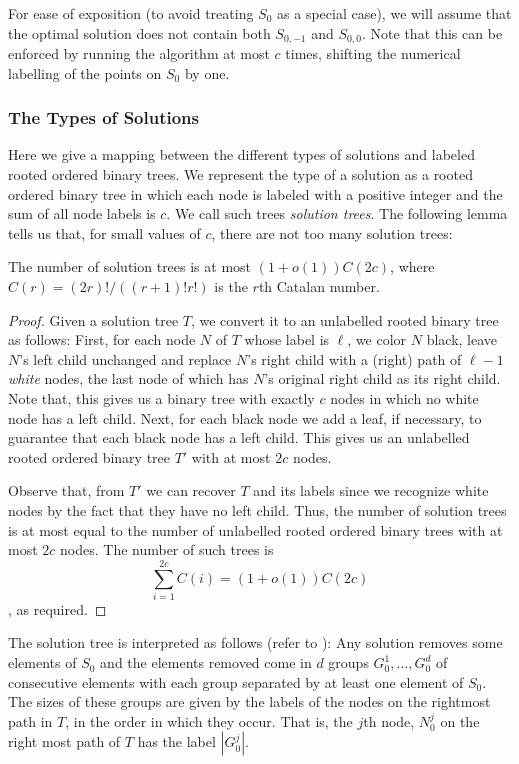 \documentclass[lotsofwhite]{patmorin}
\begin{document}
For ease of exposition (to avoid treating $S_0$ as a special case), we
will assume that the optimal solution does not contain both $S_{0,-1}$
and $S_{0,0}$.  Note that this can be enforced by running the
algorithm at most $c$ times, shifting the numerical labelling of the
points on $S_0$ by one.

\subsubsection{The Types of Solutions}

Here we give a mapping between the different types of solutions and
labeled rooted ordered binary trees. We represent the type of a
solution as a rooted ordered binary tree in which each node is labeled
with a positive integer and the sum of all node labels is $c$.  We
call such trees \emph{solution trees}.  The following lemma tells us
that, for small values of $c$, there are not too many solution trees:
 
\begin{lem}
The number of solution trees is at most $(1+o(1))C(2c)$, where
$C(r)=(2r)!/((r+1)!r!)$ is the $r$th Catalan number.
\end{lem}

\begin{proof} Given a solution tree $T$, we convert it to an
unlabelled rooted binary tree as follows: First, for each node $N$ of
$T$ whose label is $\ell$, we color $N$ black, leave $N$'s left child
unchanged and replace $N$'s right child with a (right) path of
$\ell-1$ \emph{white} nodes, the last node of which has $N$'s original
right child as its right child.  Note that, this gives us a binary
tree with exactly $c$ nodes in which no white node has a left child.
Next, for each black node we add a leaf, if necessary, to guarantee
that each black node has a left child.  This gives us an unlabelled
rooted ordered binary tree $T'$ with at most $2c$ nodes.

Observe that, from $T'$ we can recover $T$ and its labels since we
recognize white nodes by the fact that they have no left child. Thus,
the number of solution trees is at most equal to the number of
unlabelled rooted ordered binary trees with at most $2c$ nodes.  The
number of such trees is 
\[
  \sum_{i=1}^{2c} C(i) = (1+o(1))C(2c)
\]
\cite{knuth-graham-patashnik},
as required.
\end{proof}


The solution tree is interpreted as follows (refer to
): Any solution removes some elements of $S_0$
and the elements removed come in $d$ groups $G_0^1,\ldots,G_0^d$ of
consecutive elements with each group separated by at least one element
of $S_0$.  The sizes of these groups are given by the labels of the
nodes on the rightmost path in $T$, in the order in which they occur.
That is, the $j$th node, $N_0^j$ on the right most path of $T$ has the
label $|G_0^j|$. 
\end{document}
